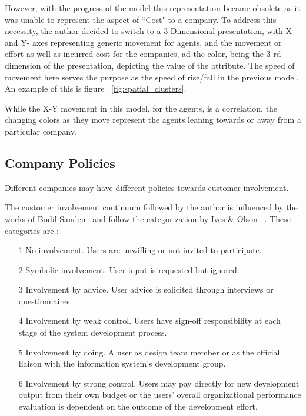 However, with the progress of the model this representation became obsolete as it was unable to represent the aspect of ``Cost" to a company. 
To address this necessity, the author decided to switch to a 3-Dimensional presentation, with X- and Y- axes representing generic movement for agents, and the movement or effort as well as incurred cost for the companies, ad the color, being the 3-rd dimension of the presentation, depicting the value of the attribute. The speed of movement here serves the purpose as the speed of rise/fall in the previous model. An example of this is figure ~\ref{fig:spatial_clusters}.

While the X-Y movement in this model, for the agents, is a correlation, the changing colors as they move represent the agents leaning towards or away from a particular company.

\subsection{Company Policies}
\label{sec:policies}
Different companies may have different policies towards customer involvement. 

The customer involvement continuum followed by the author is influenced by the works of Bodil Sanden~\cite{bodil} and follow the categorization by Ives \& Olson ~\cite{1984}.
These categories are :

\begin{enumerate}

\item[1] No involvement. Users are unwilling or not invited to participate.
\item[2] Symbolic involvement. User input is requested but ignored. 
\item[3] Involvement by advice. User advice is solicited through interviews
or questionnaires.
\item[4]  Involvement by weak control. Users have sign-off responsibility at
each stage of the system development process. 
\item[5] Involvement by doing. A user as design team member or as the
official liaison with the information system’s development group. 
\item[6] Involvement by strong control. Users may pay directly for new
development output from their own budget or the users’ overall
organizational performance evaluation is dependent on the
outcome of the development effort. 
\end{enumerate}

